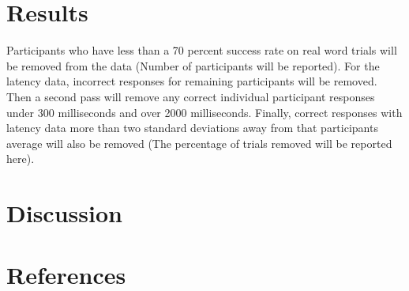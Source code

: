 \section{Results}

Participants who have less than a 70 percent success rate on real word trials will be removed from the data (Number of participants will be reported). For the latency data, incorrect responses for remaining participants will be removed. Then a second pass will remove any correct individual participant responses under 300 milliseconds and over 2000 milliseconds. Finally, correct responses with latency data more than two standard deviations away from that participants average will also be removed (The percentage of trials removed will be reported here).




\section{Discussion}




\section{References}





